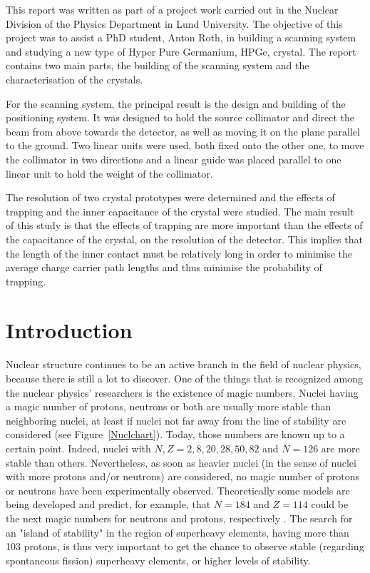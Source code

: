 \documentclass[11pt,a4paper]{article}
\begin{document}
This report was written as part of a project work carried out in the Nuclear Division of the Physics Department in Lund University. The objective of this project was to assist a PhD student, Anton Roth, in building a scanning system and studying a new type of Hyper Pure Germanium, HPGe, crystal. The report contains two main parts, the building of the scanning system and the characterisation of the crystals.

For the scanning system, the principal result is the design and building of the positioning system. It was designed to hold the source collimator and direct the beam from above towards the detector, as well as moving it on the plane parallel to the ground. Two linear units were used, both fixed onto the other one, to move the collimator in two directions and a linear guide was placed parallel to one linear unit to hold the weight of the collimator.

The resolution of two crystal prototypes were determined and the effects of trapping and the inner capacitance of the crystal were studied. The main result of this study is that the effects of trapping are more important than the effects of the capacitance of the crystal, on the resolution of the detector. This implies that the length of the inner contact must be relatively long in order to minimise the average charge carrier path lengths and thus minimise the probability of trapping.

\null\vfill

\newpage
\tableofcontents
\thispagestyle{empty}
\setcounter{page}{1}
\clearpage

\section{Introduction}

Nuclear structure continues to be an active branch in the field of nuclear physics, because there is still a lot to discover. One of the things that is recognized among the nuclear physics' researchers is the existence of magic numbers. Nuclei having a magic number of protons, neutrons or both are usually more stable than neighboring nuclei, at least if nuclei not far away from the line of stability are considered (see Figure~\ref{Nuclchart}). Today, those numbers are known up to a certain point. Indeed, nuclei with $N, Z = 2, 8, 20, 28, 50, 82$ and $N = 126$ are more stable than others. Nevertheless, as soon as heavier nuclei (in the sense of nuclei with more protons and/or neutrons) are considered, no magic number of protons or neutrons have been experimentally observed. Theoretically some models are being developed and predict, for example, that $N = 184$ and $Z = 114$ could be the next magic numbers for neutrons and protons, respectively \cite{Sobi}. The search for an "island of stability" in the region of superheavy elements, having more than 103 protons, is thus very important to get the chance to observe stable (regarding spontaneous fission) superheavy elements, or higher levels of stability.
\end{document}
